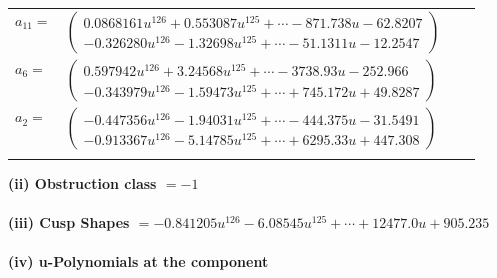 \documentclass[1p]{elsarticle_modified}
\theoremstyle{definition}
\begin{document}
\begin{tabular}{m{7pt} m{180pt} m{7pt} m{180pt} }
\flushright $a_{11}=$&$\begin{pmatrix}0.0868161 u^{126}+0.553087 u^{125}+\cdots-871.738 u-62.8207\\-0.326280 u^{126}-1.32698 u^{125}+\cdots-51.1311 u-12.2547\end{pmatrix}$ \\
\flushright $a_{6}=$&$\begin{pmatrix}0.597942 u^{126}+3.24568 u^{125}+\cdots-3738.93 u-252.966\\-0.343979 u^{126}-1.59473 u^{125}+\cdots+745.172 u+49.8287\end{pmatrix}$ \\
\flushright $a_{2}=$&$\begin{pmatrix}-0.447356 u^{126}-1.94031 u^{125}+\cdots-444.375 u-31.5491\\-0.913367 u^{126}-5.14785 u^{125}+\cdots+6295.33 u+447.308\end{pmatrix}$\\&\end{tabular}
\flushleft \textbf{(ii) Obstruction class $= -1$}\\~\\
\flushleft \textbf{(iii) Cusp Shapes $= -0.841205 u^{126}-6.08545 u^{125}+\cdots+12477.0 u+905.235$}\\~\\
\newpage\renewcommand{\arraystretch}{1}
\flushleft \textbf{(iv) u-Polynomials at the component}\newline \\
\end{document}
